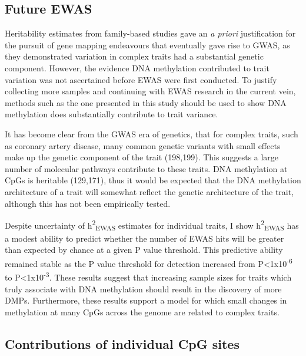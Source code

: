 \documentclass[11pt,twoside]{bristolthesis}
\begin{document}
\hypertarget{future-ewas-05}{%
\subsection{Future EWAS}\label{future-ewas-05}}

Heritability estimates from family-based studies gave an \emph{a priori} justification for the pursuit of gene mapping endeavours that eventually gave rise to GWAS, as they demonstrated variation in complex traits had a substantial genetic component. However, the evidence DNA methylation contributed to trait variation was not ascertained before EWAS were first conducted. To justify collecting more samples and continuing with EWAS research in the current vein, methods such as the one presented in this study should be used to show DNA methylation does substantially contribute to trait variance.

It has become clear from the GWAS era of genetics, that for complex traits, such as coronary artery disease, many common genetic variants with small effects make up the genetic component of the trait (198,199). This suggests a large number of molecular pathways contribute to these traits. DNA methylation at CpGs is heritable (129,171), thus it would be expected that the DNA methylation architecture of a trait will somewhat reflect the genetic architecture of the trait, although this has not been empirically tested.

Despite uncertainty of h\textsuperscript{2}\textsubscript{EWAS} estimates for individual traits, I show h\textsuperscript{2}\textsubscript{EWAS} has a modest ability to predict whether the number of EWAS hits will be greater than expected by chance at a given P value threshold. This predictive ability remained stable as the P value threshold for detection increased from P\textless1x10\textsuperscript{-6} to P\textless1x10\textsuperscript{-3}. These results suggest that increasing sample sizes for traits which truly associate with DNA methylation should result in the discovery of more DMPs. Furthermore, these results support a model for which small changes in methylation at many CpGs across the genome are related to complex traits.

\hypertarget{contribution-of-individual-cpg-sites}{%
\subsection{Contributions of individual CpG sites}\label{contribution-of-individual-cpg-sites}}
\end{document}
